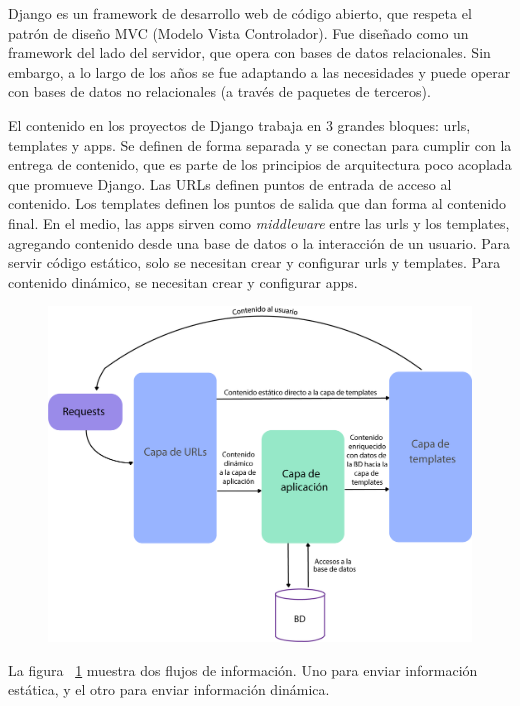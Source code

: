 Django es un framework de desarrollo web de código abierto, que respeta el patrón de diseño MVC (Modelo Vista Controlador). Fue diseñado como un framework del lado del servidor, que opera con bases de datos relacionales. Sin embargo, a lo largo de los años se fue adaptando a las necesidades y puede operar con bases de datos no relacionales (a través de paquetes de terceros).

El contenido en los proyectos de Django trabaja en 3 grandes bloques: urls, templates y apps. Se definen de forma separada y se conectan para cumplir con la entrega de contenido, que es parte de los principios de arquitectura poco acoplada que promueve Django.
Las URLs definen puntos de entrada de acceso al contenido. Los templates definen los puntos de salida que dan forma al contenido final. En el medio, las apps sirven como \textit{middleware} entre las urls y los templates, agregando contenido desde una base de datos o la interacción de un usuario. 
Para servir código estático, solo se necesitan crear y configurar urls y templates. Para contenido dinámico, se necesitan crear y configurar apps.

\begin{figure}[h!]
  \centering
    \includegraphics[scale=0.9]{images/django.png}
  \label{fig:django}
\end{figure}

La figura ~\ref{fig:django} muestra dos flujos de información. Uno para enviar información estática, y el otro para enviar información dinámica.

